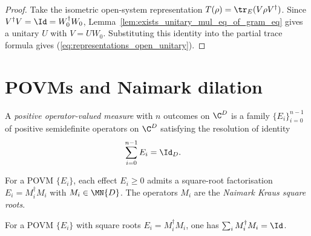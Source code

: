 \begin{proof}\leanok
    Take the isometric open-system representation
    $T(\rho)=\tr_E(V\rho V^\dagger)$. Since
    $V^\dagger V=\Id=W_0^\dagger W_0$,
    Lemma~\ref{lem:exists_unitary_mul_eq_of_gram_eq}
    gives a unitary $U$ with $V=UW_0$. Substituting this identity into the
    partial trace formula gives (\ref{eq:representations_open_unitary}).
\end{proof}

\section{POVMs and Naimark dilation}
\label{sec:povm_naimark}

\begin{definition}\label{def:povm}
    \leanok
    A \emph{positive operator-valued measure} with $n$ outcomes on $\C^D$
    is a family $\{E_i\}_{i=0}^{n-1}$ of positive semidefinite
    operators on $\C^D$ satisfying the resolution of identity
    \begin{align}
        \sum_{i=0}^{n-1}E_i
        &=\Id_D.
        \label{eq:representations_povm_resolution}
    \end{align}
\end{definition}

\begin{definition}\label{def:naimark_kraus}
    \leanok
    For a POVM $\{E_i\}$, each effect $E_i\ge0$ admits a square-root
    factorisation $E_i=M_i^\dagger M_i$ with $M_i\in\MN{D}$. The
    operators $M_i$ are the \emph{Naimark Kraus square roots}.
\end{definition}

\begin{theorem}
    \label{lem:naimark_square_root_normalization}
    \leanok
    For a POVM $\{E_i\}$ with square roots $E_i=M_i^\dagger M_i$,
    one has $\sum_iM_i^\dagger M_i=\Id$.
\end{theorem}

